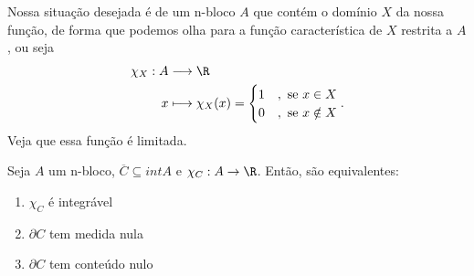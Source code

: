 \begin{intuition}
    Nossa situação desejada é de um n-bloco $A$ que contém o domínio $X$ da nossa função, de forma que podemos olha para a função característica de $X$ restrita a $A$, ou seja
    \begin{align*}
        \chi_X: A &\longrightarrow \R \\
        x &\longmapsto \chi_X(x) = \begin{cases}
	    1 &, \text{ se }x\in X \\
	    0 &, \text{ se }x\notin X
        \end{cases}
    .\end{align*}
    Veja que essa função é limitada.
\end{intuition}

\begin{prop}
    Seja $A$ um n-bloco, $\overline{C}\subseteq int A$ e $\chi_C:A\to \R$. Então, são equivalentes:
    \begin{enumerate}
        \item $\chi_C$ é integrável
	\item $\partial C$ tem medida nula
	\item $\partial C$ tem conteúdo nulo
    \end{enumerate}
\end{prop}

